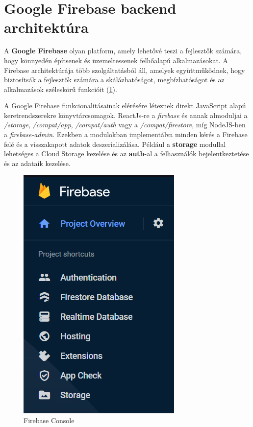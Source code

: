 \section {Google Firebase backend architektúra} \label{firebase}

A \textbf{Google Firebase} olyan platform, amely lehetővé teszi a fejlesztők számára, hogy könnyedén építsenek és üzemeltessenek felhőalapú alkalmazásokat. A Firebase architektúrája több szolgáltatásból áll, amelyek együttműködnek, hogy biztosítsák a fejlesztők számára a skálázhatóságot, megbízhatóságot és az alkalmazások széleskörű funkcióit (\ref{abra:firebaseConsole}).

A Google Firebase funkcionalitásainak elérésére léteznek direkt JavaScript alapú keretrendszerekre könyvtárcsomagok. ReactJs-re a \textit{firebase} és annak almoduljai a \textit{/storage}, \textit{/compat/app}, \textit{/compat/auth} vagy a \textit{/compat/firestore}, míg NodeJS-ben a \textit{firebase-admin}. Ezekben a modulokban implementálva minden kérés a Firebase felé és a visszakapott adatok deszerializálása. Például a \textbf{storage} modullal lehetséges a Cloud Storage kezelése és az \textbf{auth}-al a felhasználók bejelentkeztetése és az adataik kezelése.

\begin{figure}[!h]
	\centering
	\includegraphics[scale=0.6]{images/firebaseConsole}
	\caption{Firebase Console}
	\label{abra:firebaseConsole}
\end{figure}
\pagebreak

